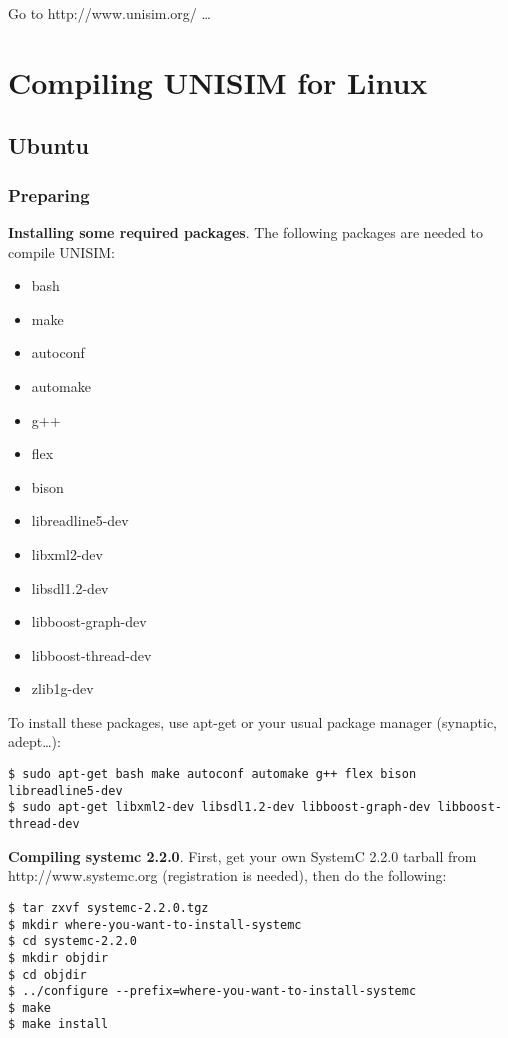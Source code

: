 Go to http://www.unisim.org/ \ldots

\section{Compiling UNISIM for Linux}
\label{compiling_unisim_for_linux}

\subsection{Ubuntu}
\label{compiling_unisim_for_ubuntu}

\subsubsection{Preparing}

\noindent \textbf{Installing some required packages}. The following packages are needed to compile UNISIM:
\begin{itemize}
\item bash
\item make
\item autoconf
\item automake
\item g++
\item flex
\item bison
\item libreadline5-dev
\item libxml2-dev
\item libsdl1.2-dev
\item libboost-graph-dev
\item libboost-thread-dev
\item zlib1g-dev
\end{itemize}

To install these packages, use apt-get or your usual package manager (synaptic, adept\ldots):
\begin{verbatim}
$ sudo apt-get bash make autoconf automake g++ flex bison libreadline5-dev
$ sudo apt-get libxml2-dev libsdl1.2-dev libboost-graph-dev libboost-thread-dev
\end{verbatim}

\noindent \textbf{Compiling systemc 2.2.0}. First, get your own SystemC 2.2.0 tarball from http://www.systemc.org (registration is needed), then do the following:

\begin{verbatim}
$ tar zxvf systemc-2.2.0.tgz
$ mkdir where-you-want-to-install-systemc
$ cd systemc-2.2.0
$ mkdir objdir
$ cd objdir
$ ../configure --prefix=where-you-want-to-install-systemc
$ make
$ make install
\end{verbatim}

